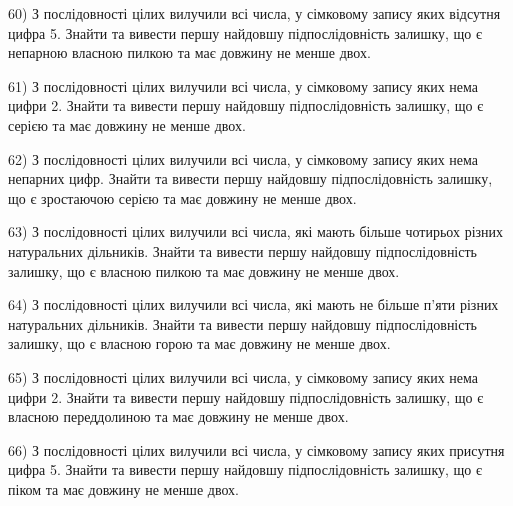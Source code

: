 \documentclass[11pt, ukrainian]{article}
\begin{document}
\par
\vspace{0.9cm}
60) \space 
З послідовності цілих вилучили всі числа, у сімковому запису яких відсутня цифра 5. Знайти та вивести першу найдовшу підпослідовність залишку, що є непарною власною пилкою та має довжину не менше двох.

\par
\vspace{0.9cm}
61) \space 
З послідовності цілих вилучили всі числа, у сімковому запису яких нема цифри 2. Знайти та вивести першу найдовшу підпослідовність залишку, що є серією та має довжину не менше двох.

\par
\vspace{0.9cm}
62) \space 
З послідовності цілих вилучили всі числа, у сімковому запису яких нема непарних цифр. Знайти та вивести першу найдовшу підпослідовність залишку, що є зростаючою серією та має довжину не менше двох.

\par
\vspace{0.9cm}
63) \space 
З послідовності цілих вилучили всі числа, які мають більше чотирьох різних натуральних дільників. Знайти та вивести першу найдовшу підпослідовність залишку, що є власною пилкою та має довжину не менше двох.

\par
\vspace{0.9cm}
64) \space 
З послідовності цілих вилучили всі числа, які мають не більше п'яти різних натуральних дільників. Знайти та вивести першу найдовшу підпослідовність залишку, що є власною горою та має довжину не менше двох.

\par
\vspace{0.9cm}
65) \space 
З послідовності цілих вилучили всі числа, у сімковому запису яких нема цифри 2. Знайти та вивести першу найдовшу підпослідовність залишку, що є власною переддолиною та має довжину не менше двох.

\par
\vspace{0.9cm}
66) \space 
З послідовності цілих вилучили всі числа, у сімковому запису яких присутня цифра 5. Знайти та вивести першу найдовшу підпослідовність залишку, що є піком та має довжину не менше двох.
\end{document}
